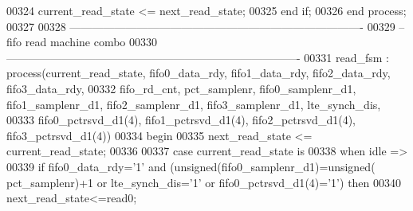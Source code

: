 \begin{DoxyCode}
00324         \textcolor{vhdlchar}{current_read_state} \textcolor{vhdlchar}{<=} \textcolor{vhdlchar}{next_read_state};
00325     \textcolor{keywordflow}{end} \textcolor{keywordflow}{if}; 
00326 \textcolor{keywordflow}{end} \textcolor{keywordflow}{process};
00327 
00328 \textcolor{keyword}{-------------------------------------------------------------------------------}
00329 \textcolor{keyword}{--fifo read machine combo}
00330 \textcolor{keyword}{-------------------------------------------------------------------------------}
00331 read\_fsm : \textcolor{keywordflow}{process}(current_read_state, fifo0_data_rdy, fifo1_data_rdy, 
      fifo2_data_rdy, fifo3_data_rdy,
00332                             fifo_rd_cnt, pct_samplenr, fifo0_samplenr_d1, 
      fifo1_samplenr_d1, fifo2_samplenr_d1, fifo3_samplenr_d1, lte_synch_dis,
00333                             fifo0_pctrsvd_d1(\textcolor{vhdllogic}{4}), fifo1_pctrsvd_d1(\textcolor{vhdllogic}{4}), 
      fifo2_pctrsvd_d1(\textcolor{vhdllogic}{4}), fifo3_pctrsvd_d1(\textcolor{vhdllogic}{4})) 
00334 \textcolor{vhdlkeyword}{begin}
00335     \textcolor{vhdlchar}{next_read_state} \textcolor{vhdlchar}{<=} \textcolor{vhdlchar}{current_read_state};
00336     
00337     \textcolor{keywordflow}{case} \textcolor{vhdlchar}{current_read_state} \textcolor{keywordflow}{is}
00338       \textcolor{keywordflow}{when} \textcolor{vhdlchar}{idle} \textcolor{vhdlchar}{=}\textcolor{vhdlchar}{>}
00339         \textcolor{keywordflow}{if} \textcolor{vhdlchar}{fifo0_data_rdy}\textcolor{vhdlchar}{=}\textcolor{vhdlchar}{'}\textcolor{vhdllogic}{}\textcolor{vhdllogic}{1}\textcolor{vhdlchar}{'}  \textcolor{keywordflow}{and} \textcolor{vhdlchar}{(}\textcolor{comment}{unsigned}\textcolor{vhdlchar}{(}\textcolor{vhdlchar}{fifo0_samplenr_d1}\textcolor{vhdlchar}{)}\textcolor{vhdlchar}{=}\textcolor{comment}{unsigned}\textcolor{vhdlchar}{(}\textcolor{vhdlchar}{
      pct_samplenr}\textcolor{vhdlchar}{)}\textcolor{vhdlchar}{+}\textcolor{vhdllogic}{}\textcolor{vhdllogic}{1} \textcolor{keywordflow}{or} \textcolor{vhdlchar}{lte_synch_dis}\textcolor{vhdlchar}{=}\textcolor{vhdlchar}{'}\textcolor{vhdllogic}{}\textcolor{vhdllogic}{1}\textcolor{vhdlchar}{'} \textcolor{keywordflow}{or} \textcolor{vhdlchar}{fifo0_pctrsvd_d1}\textcolor{vhdlchar}{(}\textcolor{vhdllogic}{}\textcolor{vhdllogic}{4}\textcolor{vhdlchar}{)}\textcolor{vhdlchar}{=}\textcolor{vhdlchar}{'}\textcolor{vhdllogic}{}\textcolor{vhdllogic}{1}\textcolor{vhdlchar}{'}\textcolor{vhdlchar}{)} \textcolor{keywordflow}{then} 
00340             \textcolor{vhdlchar}{next_read_state}\textcolor{vhdlchar}{<=}\textcolor{vhdlchar}{read0};

\end{DoxyCode}
